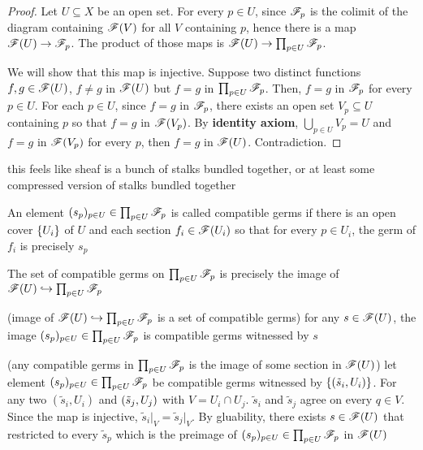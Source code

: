 \begin{proof}
	Let $U \subseteq X$ be an open set. For every $p \in U$, since $\mathscr{F}_p$ is the colimit of the diagram containing $\mathscr{F}(V)$ for all $V$ containing $p$, hence there is a map $\mathscr{F}(U) \to \mathscr{F}_p$. The product of those maps is $\mathscr{F}(U) \to \prod_{p \in U} \mathscr{F}_p$.
	
	We will show that this map is injective. Suppose two distinct functions $f, g \in \mathscr{F}(U)$, $f \neq g$ in $\mathscr{F}(U)$ but $f = g$ in $\prod_{p \in U} \mathscr{F}_p$. Then, $f = g$ in $\mathscr{F}_p$ for every $p \in U$. For each $p \in U$, since $f = g$ in $\mathscr{F}_p$, there exists an open set $V_p \subseteq U$ containing $p$ so that $f = g$ in $\mathscr{F}(V_p)$. By \textbf{identity axiom}, $\bigcup_{p \in U} V_p = U$ and $f = g$ in $\mathscr{F}(V_p)$ for every $p$, then $f = g$ in $\mathscr{F}(U)$. Contradiction.
\end{proof}

\begin{remark}
	this feels like sheaf is a bunch of stalks bundled together, or at least some compressed version of stalks bundled together
\end{remark}

\begin{definition}
	An element $(s_p)_{p \in U} \in \prod_{p \in U} \mathscr{F}_p$ is called compatible germs if there is an open cover $\{U_i\}$ of $U$ and each section $f_i \in \mathscr{F}(U_i)$ so that for every $p \in U_i$, the germ of $f_i$ is precisely $s_p$
\end{definition}

\begin{proposition}
	The set of compatible germs on $\prod_{p \in U} \mathscr{F}_p$ is precisely the image of $\mathscr{F}(U) \hookrightarrow \prod_{p \in U} \mathscr{F}_p$
\end{proposition}

\begin{longproof}
	(image of $\mathscr{F}(U) \hookrightarrow \prod_{p \in U} \mathscr{F}_p$ is a set of compatible germs) for any $s \in \mathscr{F}(U)$, the image $(s_p)_{p \in U} \in \prod_{p \in U} \mathscr{F}_p$ is compatible germs witnessed by $s$
	
	(any compatible germs in $\prod_{p \in U} \mathscr{F}_p$ is the image of some section in $\mathscr{F}(U)$) let element $(s_p)_{p \in U} \in \prod_{p \in U} \mathscr{F}_p$ be compatible germs witnessed by $\{(\tilde{s}_i, U_i)\}$. For any two $(\tilde{s}_i, U_i)$ and $(\tilde{s}_j, U_j)$ with $V = U_i \cap U_j$. $\tilde{s}_i$ and $\tilde{s}_j$ agree on every $q \in V$. Since the map is injective, $\tilde{s}_i \vert_{V} = \tilde{s}_j \vert_V$. By gluability, there exists $s \in \mathscr{F}(U)$ that restricted to every $\tilde{s}_p$ which is the preimage of $(s_p)_{p \in U} \in \prod_{p \in U} \mathscr{F}_p$ in $\mathscr{F}(U)$
\end{longproof}


